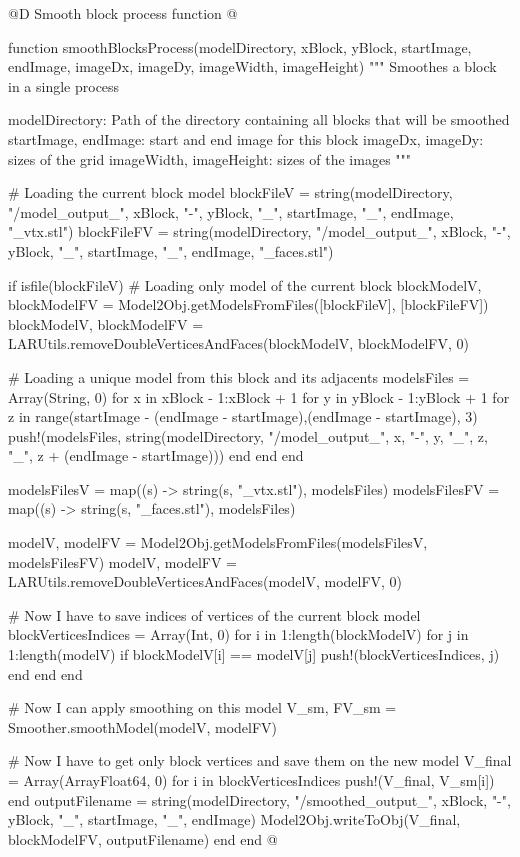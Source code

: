 \documentclass[11pt,oneside]{article}	%
\begin{document}
@D Smooth block process function
@{function smoothBlocksProcess(modelDirectory,
                             xBlock, yBlock,
                             startImage, endImage,
                             imageDx, imageDy,
                             imageWidth, imageHeight)
  """
  Smoothes a block in a single process

  modelDirectory: Path of the directory containing all blocks
                  that will be smoothed
  startImage, endImage: start and end image for this block
  imageDx, imageDy: sizes of the grid
  imageWidth, imageHeight: sizes of the images
  """

  # Loading the current block model
  blockFileV = string(modelDirectory, "/model_output_", xBlock, "-", yBlock,
                      "_", startImage, "_", endImage, "_vtx.stl")
  blockFileFV = string(modelDirectory, "/model_output_", xBlock, "-", yBlock,
                       "_", startImage, "_", endImage, "_faces.stl")

  if isfile(blockFileV)
    # Loading only model of the current block
    blockModelV, blockModelFV = Model2Obj.getModelsFromFiles([blockFileV], [blockFileFV])
    blockModelV, blockModelFV = LARUtils.removeDoubleVerticesAndFaces(blockModelV,
                                                                      blockModelFV, 0)

    # Loading a unique model from this block and its adjacents
    modelsFiles = Array(String, 0)
    for x in xBlock - 1:xBlock + 1
      for y in yBlock - 1:yBlock + 1
        for z in range(startImage - (endImage - startImage),(endImage - startImage), 3)
          push!(modelsFiles, string(modelDirectory, "/model_output_",
                                    x, "-", y, "_", z, "_", z + (endImage - startImage)))
        end
      end
    end

    modelsFilesV = map((s) -> string(s, "_vtx.stl"), modelsFiles)
    modelsFilesFV = map((s) -> string(s, "_faces.stl"), modelsFiles)

    modelV, modelFV = Model2Obj.getModelsFromFiles(modelsFilesV, modelsFilesFV)
    modelV, modelFV = LARUtils.removeDoubleVerticesAndFaces(modelV, modelFV, 0)

    # Now I have to save indices of vertices of the current block model
    blockVerticesIndices = Array(Int, 0)
    for i in 1:length(blockModelV)
      for j in 1:length(modelV)
        if blockModelV[i] == modelV[j]
          push!(blockVerticesIndices, j)
        end
      end
    end

    # Now I can apply smoothing on this model
    V_sm, FV_sm = Smoother.smoothModel(modelV, modelFV)

    # Now I have to get only block vertices and save them on the new model
    V_final = Array(Array{Float64}, 0)
    for i in blockVerticesIndices
      push!(V_final, V_sm[i])
    end
    outputFilename = string(modelDirectory, "/smoothed_output_", xBlock, "-",
                            yBlock, "_", startImage, "_", endImage)
    Model2Obj.writeToObj(V_final, blockModelFV, outputFilename)
  end
end @}
\end{document}
